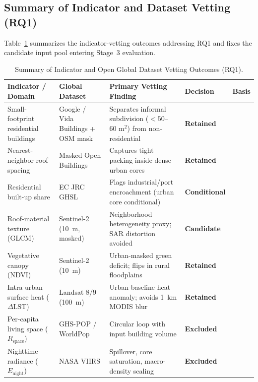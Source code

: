 \subsection{Summary of Indicator and Dataset Vetting (RQ1)}
Table~\ref{tab:vetting_matrix} summarizes the indicator-vetting outcomes addressing RQ1 and fixes the candidate input pool entering Stage~3 evaluation.

\begin{table}[htbp]
\centering
\caption{Summary of Indicator and Open Global Dataset Vetting Outcomes (RQ1).}
\label{tab:vetting_matrix}
\footnotesize
\begin{tabularx}{\textwidth}{@{}>{\raggedright\arraybackslash}p{3.0cm}>{\raggedright\arraybackslash}p{2.3cm}>{\raggedright\arraybackslash}X l >{\raggedright\arraybackslash}p{2.8cm}@{}}
\toprule
\textbf{Indicator / Domain} & \textbf{Global Dataset} & \textbf{Primary Vetting Finding} & \textbf{Decision} & \textbf{Basis} \\
\midrule
Small-footprint residential buildings & Google / Vida Buildings + OSM mask & Separates informal subdivision ($<50$--$60\text{ m}^2$) from non-residential & \textbf{Retained} & \citet{Kuffer2016, Najmi2022} \\
Nearest-neighbor roof spacing & Masked Open Buildings & Captures tight packing inside dense urban cores & \textbf{Retained} & \citet{Jochem2021, Taubenbock2018} \\
Residential built-up share & EC JRC GHSL & Flags industrial/port encroachment (urban core conditional) & \textbf{Conditional} & \citet{Pesaresi2024} \\
Roof-material texture (GLCM) & Sentinel-2 (10~m, masked) & Neighborhood heterogeneity proxy; SAR distortion avoided & \textbf{Candidate} & \citet{deMattos2021, Wurm2017b} \\
Vegetative canopy (NDVI) & Sentinel-2 (10~m) & Urban-masked green deficit; flips in rural floodplains & \textbf{Retained} & \citet{Chakraborty2019b, Hsu2021} \\
Intra-urban surface heat ($\Delta\text{LST}$) & Landsat 8/9 (100~m) & Urban-baseline heat anomaly; avoids 1~km MODIS blur & \textbf{Retained} & \citet{Chakraborty2019a, Voogt2003} \\
Per-capita living space ($R_{\text{space}}$) & GHS-POP / WorldPop & Circular loop with input building volume & \textbf{Excluded} & \citet{Pesaresi2024, Stevens2015} \\
Nighttime radiance ($E_{\text{night}}$) & NASA VIIRS & Spillover, core saturation, macro-density scaling & \textbf{Excluded} & \citet{Gibson2021, Zhao2019} \\

\end{tabularx}
\end{table}
